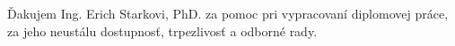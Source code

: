 Ďakujem Ing. Erich Starkovi, PhD. za pomoc pri vypracovaní diplomovej práce, za jeho neustálu dostupnosť, trpezlivosť a odborné rady.